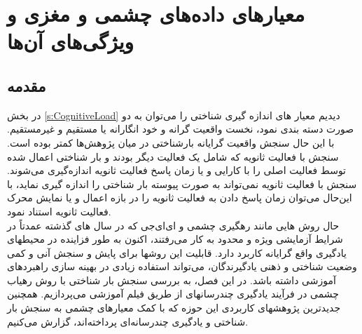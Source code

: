 \section{معیار‌های داده‌های چشمی و مغزی و ویژگی‌های آن‌ها}
\label{s:eye}
\subsection{مقدمه}
در بخش
\ref{s:CognitiveLoad}
دیدیم معیار های اندازه گیری شناختی را می‌توان به دو صورت دسته بندی نمود، نخست واقعیت گرانه 
و خود انگارانه یا مستقیم و غیرمستقیم. با این حال سنجش واقعیت گرایانه بارشناختی در میان پژوهش‌ها کمتر بوده‌ است. سنجش با فعالیت ثانویه که شامل یک فعالیت دیگر بودند و بار شناختی اعمال شده توسط فعالیت اصلی را با کارایی و یا زمان پاسخ فعالیت ثانویه اندازه‌گیری می‌شوند. سنجش با فعالیت ثانویه نمی‌تواند به صورت پیوسته بار شناختی را اندازه گیری نماید، با این‌حال می‌توان  زمان پاسخ دادن به فعالیت ثانویه را در بازه اعمال و یا نمایش محرک فعالیت ثانویه استناد نمود.
\cite{antonenko2010using}
\\
حال روش هایی مانند رهگیری چشمی و ای‌ای‌جی که در سال های گذشته عمدتاً در شرایط آزمایشی ویژه و محدود به کار می‌رفتند، اكنون به طور فزاینده در محيطهای یادگيری واقع گرایانه كاربرد دارد. قابليت این 
روشها برای پایش و سنجش آنی و كمی وضعيت شناختی و ذهنی یادگيرندگان، می‌تواند استفاده زیادی 
در بهينه سازی راهبردهای آموزشی داشته باشد.
\cite{jraidi2019assessing}
در این فصل، به بررسی سنجش بار شناختی با روش رهیاب چشمی در فرآیند یادگيری چندرسانهای از طریق فيلم آموزشی می‌پردازیم. 
همچنين جدیدترین پژوهشهای كاربردی این حوزه كه با كمک معيارهای چشمی به سنجش بار 
شناختی و یادگيری چندرسانه‌ای پرداخته‌اند، گزارش می‌كنيم.


